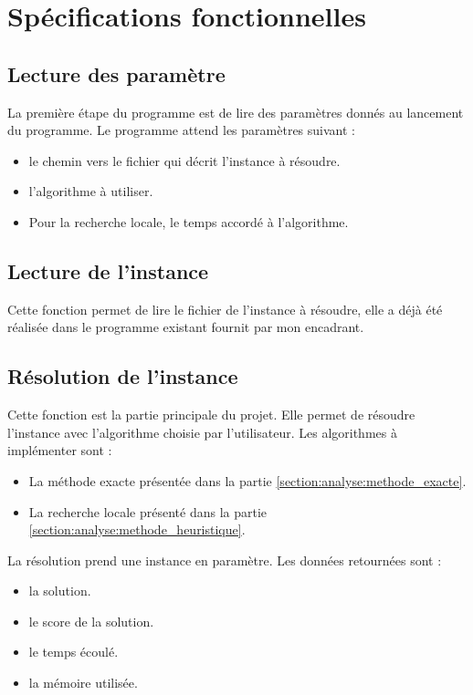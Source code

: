 \chapter{Spécifications fonctionnelles}


\section{Lecture des paramètre}
La première étape du programme est de lire des paramètres donnés au lancement du programme.
Le programme attend les paramètres suivant :
\begin{itemize}
    \item le chemin vers le fichier qui décrit l'instance à résoudre.
    \item l'algorithme à utiliser.
    \item Pour la recherche locale, le temps accordé à l'algorithme.
\end{itemize}

\section{Lecture de l'instance}
Cette fonction permet de lire le fichier de l'instance à résoudre, elle a déjà été réalisée dans le programme existant fournit par mon encadrant.

\section{Résolution de l'instance}
Cette fonction est la partie principale du projet.
Elle permet de résoudre l'instance avec l'algorithme choisie par l'utilisateur.
Les algorithmes à implémenter sont :
\begin{itemize}
    \item La méthode exacte présentée dans la partie \autoref{section:analyse:methode_exacte}.
    \item La recherche locale présenté dans la partie \autoref{section:analyse:methode_heuristique}.
\end{itemize}
La résolution prend une instance en paramètre.
Les données retournées sont :
\begin{itemize}
    \item la solution.
    \item le score de la solution.
    \item le temps écoulé.
    \item la mémoire utilisée.
\end{itemize}

